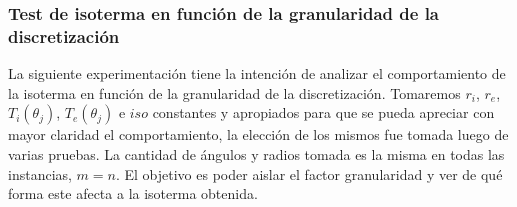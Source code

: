 \subsubsection{Test de isoterma en función de la granularidad de la discretización}
La siguiente experimentación tiene la intención de analizar el comportamiento de la isoterma en función de la granularidad de la discretización.
Tomaremos $r_i$, $r_e$, $T_i(\theta_j)$, $T_e(\theta_j)$ e $iso$ constantes y apropiados para que se pueda apreciar con mayor claridad el comportamiento, la elección de los mismos fue tomada luego de varias pruebas.
La cantidad de ángulos y radios tomada es la misma en todas las instancias, $m = n$. El objetivo es poder aislar el factor granularidad y ver de qué forma este afecta a la isoterma obtenida.
